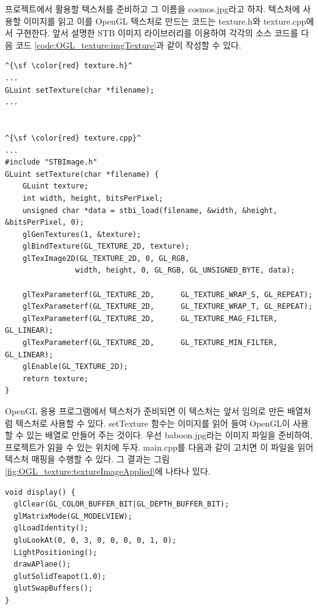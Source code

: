 프로젝트에서 활용할 텍스처를 준비하고 그 이름을 {\sf cosmos.jpg}라고 하자. 텍스처에 사용할 이미지를 읽고 이를 OpenGL 텍스처로 만드는 코드는 {\sf texture.h}와 
{\sf texture.cpp}에서 구현한다.  앞서 설명한 STB 이미지 라이브러리를 이용하여 각각의 소스 코드를 다음 코드 \ref{code:OGL_texture:imgTexture}과 
같이 작성할 수 있다.

\begin{algorithmbis}\label{code:OGL_texture:imgTexture}
\lstset{language=C++, escapechar=^} 
\begin{lstlisting}
^{\sf \color{red} texture.h}^
...
GLuint setTexture(char *filename);
...


^{\sf \color{red} texture.cpp}^
...
#include "STBImage.h"
GLuint setTexture(char *filename) {
	GLuint texture;
	int width, height, bitsPerPixel;
	unsigned char *data = stbi_load(filename, &width, &height, &bitsPerPixel, 0);
	glGenTextures(1, &texture);
	glBindTexture(GL_TEXTURE_2D, texture);
	glTexImage2D(GL_TEXTURE_2D, 0, GL_RGB,
				width, height, 0, GL_RGB, GL_UNSIGNED_BYTE, data);

	glTexParameterf(GL_TEXTURE_2D, 		GL_TEXTURE_WRAP_S, GL_REPEAT);
	glTexParameterf(GL_TEXTURE_2D, 		GL_TEXTURE_WRAP_T, GL_REPEAT);
	glTexParameterf(GL_TEXTURE_2D, 		GL_TEXTURE_MAG_FILTER, GL_LINEAR);
	glTexParameterf(GL_TEXTURE_2D, 		GL_TEXTURE_MIN_FILTER, GL_LINEAR);
	glEnable(GL_TEXTURE_2D);
	return texture;
}
\end{lstlisting}
\end{algorithmbis}

OpenGL 응용 프로그램에서 텍스처가 준비되면 이 텍스처는 앞서 임의로 만든 배열처럼 텍스처로 사용할 수 있다. 
{\sf setTexture} 함수는 이미지를 읽어 들여 OpenGL이 사용할 수 있는 배열로 만들어 주는 것이다.
우선 {\sf baboon.jpg}라는 이미지 파일을 준비하여, 프로젝트가 읽을 수 있는 위치에 두자.
{\sf main.cpp}를 다음과 같이 고치면 이 파일을 읽어 텍스처 매핑을 수행할 수 있다.
그 결과는 그림 \ref{fig:OGL_texture:textureImageApplied}에 나타나 있다.

\begin{algorithmbis}\label{code:OGL_texture:TextureApplication}
\lstset{language=C++} 
\begin{lstlisting}
void display() {
  glClear(GL_COLOR_BUFFER_BIT|GL_DEPTH_BUFFER_BIT);
  glMatrixMode(GL_MODELVIEW);
  glLoadIdentity();
  gluLookAt(0, 0, 3, 0, 0, 0, 0, 1, 0);
  LightPositioning();
  drawAPlane();
  glutSolidTeapot(1.0);
  glutSwapBuffers();
}
\end{lstlisting}
\end{algorithmbis}


